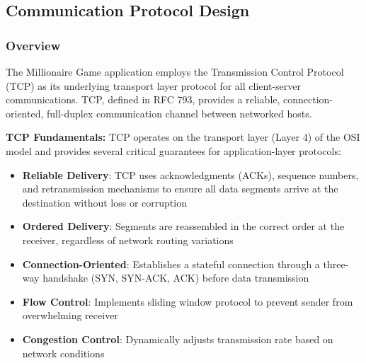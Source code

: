 \subsection{Communication Protocol Design}

\subsubsection{Overview}

The Millionaire Game application employs the Transmission Control Protocol (TCP) as its underlying transport layer protocol for all client-server communications. TCP, defined in RFC 793, provides a reliable, connection-oriented, full-duplex communication channel between networked hosts.

\textbf{TCP Fundamentals:}
TCP operates on the transport layer (Layer 4) of the OSI model and provides several critical guarantees for application-layer protocols:
\begin{itemize}
    \item \textbf{Reliable Delivery}: TCP uses acknowledgments (ACKs), sequence numbers, and retransmission mechanisms to ensure all data segments arrive at the destination without loss or corruption
    \item \textbf{Ordered Delivery}: Segments are reassembled in the correct order at the receiver, regardless of network routing variations
    \item \textbf{Connection-Oriented}: Establishes a stateful connection through a three-way handshake (SYN, SYN-ACK, ACK) before data transmission
    \item \textbf{Flow Control}: Implements sliding window protocol to prevent sender from overwhelming receiver
    \item \textbf{Congestion Control}: Dynamically adjusts transmission rate based on network conditions
\end{itemize}

